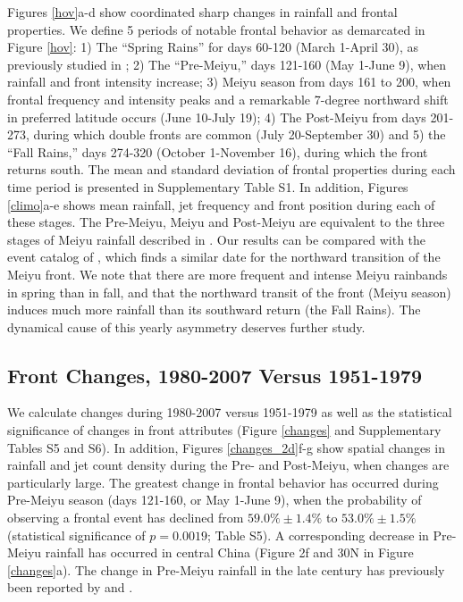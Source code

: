 \documentclass[draft,grl]{AGUTeX}
\begin{document}
\begin{article}
	Figures \ref{hov}a-d show coordinated sharp changes in rainfall and frontal properties. We define 5 periods of notable frontal behavior as demarcated in Figure \ref{hov}: 1) The ``Spring Rains'' for days 60-120 (March 1-April 30), as previously studied in \citet{Tian1998}; 2) The ``Pre-Meiyu,'' days 121-160 (May 1-June 9), when rainfall and front intensity increase; 3) Meiyu season from days 161 to 200, when frontal frequency and intensity peaks and a remarkable 7-degree northward shift in preferred latitude occurs (June 10-July 19); 4) The Post-Meiyu from days 201-273, during which double fronts are common (July 20-September 30) and 5) the ``Fall Rains,'' days 274-320 (October 1-November 16), during which the front returns south. The mean and standard deviation of frontal properties during each time period is presented in Supplementary Table S1. In addition, Figures \ref{climo}a-e shows mean rainfall, jet frequency and front position during each of these stages. The Pre-Meiyu, Meiyu and Post-Meiyu are equivalent to the three stages of Meiyu rainfall described in \citet{Ding2005}. Our results can be compared with the event catalog of \citet{Xu2009}, which finds a similar date for the northward transition of the Meiyu front. We note that there are more frequent and intense Meiyu rainbands in spring than in fall, and that the northward transit of the front (Meiyu season) induces much more rainfall than its southward return (the Fall Rains). The dynamical cause of this yearly asymmetry deserves further study.
		
\subsection{Front Changes, 1980-2007 Versus 1951-1979}
	
	We calculate changes during 1980-2007 versus 1951-1979 as well as the statistical significance of changes in front attributes (Figure \ref{changes} and Supplementary Tables S5 and S6). In addition, Figures \ref{changes_2d}f-g show spatial changes in rainfall and jet count density during the Pre- and Post-Meiyu, when changes are particularly large. The greatest change in frontal behavior has occurred during Pre-Meiyu season (days 121-160, or May 1-June 9), when the probability of observing a frontal event has declined from $59.0\% \pm 1.4\%$ to $53.0\% \pm 1.5\%$ (statistical significance of $p=0.0019$; Table S5). A corresponding decrease in Pre-Meiyu rainfall has occurred in central China (Figure 2f and 30\textdegree N in Figure \ref{changes}a). The change in Pre-Meiyu rainfall in the late  century has previously been reported by \citet{Xin2006} and \citet{Wang2009}.
		

\end{article}
\end{document}
